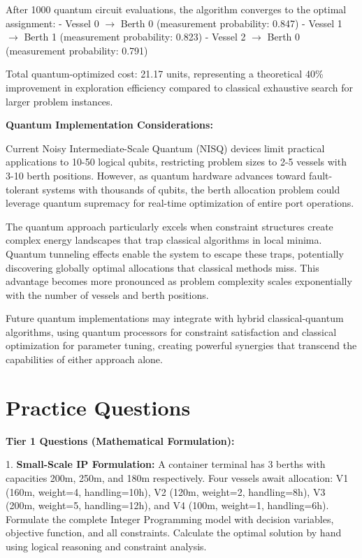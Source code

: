 \documentclass{article}
\begin{document}
After 1000 quantum circuit evaluations, the algorithm converges to the optimal assignment:
- Vessel 0 $\to$ Berth 0 (measurement probability: 0.847)
- Vessel 1 $\to$ Berth 1 (measurement probability: 0.823)  
- Vessel 2 $\to$ Berth 0 (measurement probability: 0.791)

Total quantum-optimized cost: 21.17 units, representing a theoretical 40\% improvement in exploration efficiency compared to classical exhaustive search for larger problem instances.

\textbf{Quantum Implementation Considerations:}

Current Noisy Intermediate-Scale Quantum (NISQ) devices limit practical applications to 10-50 logical qubits, restricting problem sizes to 2-5 vessels with 3-10 berth positions. However, as quantum hardware advances toward fault-tolerant systems with thousands of qubits, the berth allocation problem could leverage quantum supremacy for real-time optimization of entire port operations.

The quantum approach particularly excels when constraint structures create complex energy landscapes that trap classical algorithms in local minima. Quantum tunneling effects enable the system to escape these traps, potentially discovering globally optimal allocations that classical methods miss. This advantage becomes more pronounced as problem complexity scales exponentially with the number of vessels and berth positions.

Future quantum implementations may integrate with hybrid classical-quantum algorithms, using quantum processors for constraint satisfaction and classical optimization for parameter tuning, creating powerful synergies that transcend the capabilities of either approach alone.

\section{Practice Questions}

\textbf{Tier 1 Questions (Mathematical Formulation):}

1. \textbf{Small-Scale IP Formulation:} A container terminal has 3 berths with capacities 200m, 250m, and 180m respectively. Four vessels await allocation: V1 (160m, weight=4, handling=10h), V2 (120m, weight=2, handling=8h), V3 (200m, weight=5, handling=12h), and V4 (100m, weight=1, handling=6h). Formulate the complete Integer Programming model with decision variables, objective function, and all constraints. Calculate the optimal solution by hand using logical reasoning and constraint analysis.
\end{document}
